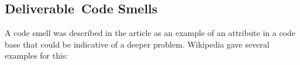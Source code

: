
\renewcommand{\courseNumber}{cs105a}
\renewcommand{\courseTitle}{Software Engineering to Scale}


\renewcommand{\assignmentType}{Deliverable}
\renewcommand{\assignmentNum}{Code Smells}
\renewcommand{\assignmentDueDate}{1/28/2015}



\begin{center}\section*{\assignmentType\ \assignmentNum}\end{center}

	A code smell was described in the article as an example of an attribute in a code base that could be indicative of a deeper problem. Wikipedia gave several examples for this:
